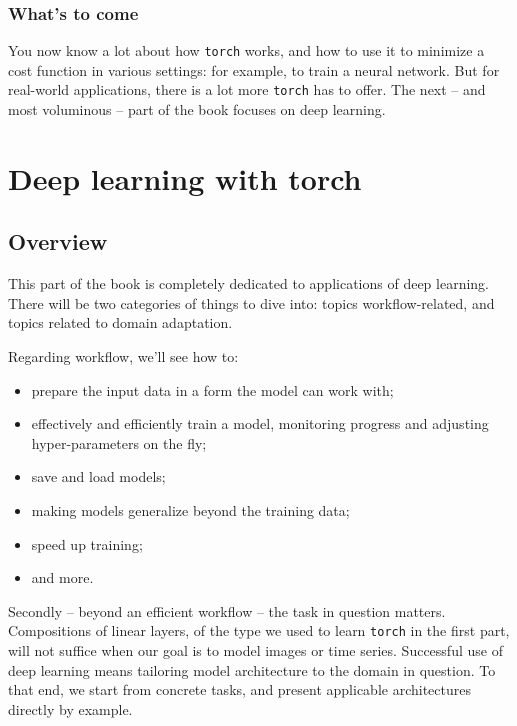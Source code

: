 \documentclass[
  letterpaper,
]{krantz}
\providecommand{\tightlist}{%
  \setlength{\itemsep}{0pt}\setlength{\parskip}{0pt}}\usepackage{longtable,booktabs,array}
\begin{document}
\hypertarget{whats-to-come}{%
\section{What's to come}\label{whats-to-come}}

You now know a lot about how \texttt{torch} works, and how to use it to
minimize a cost function in various settings: for example, to train a
neural network. But for real-world applications, there is a lot more
\texttt{torch} has to offer. The next -- and most voluminous -- part of
the book focuses on deep learning.

\part{Deep learning with torch}

\hypertarget{sec:dl-overview}{%
\chapter{Overview}\label{sec:dl-overview}}

This part of the book is completely dedicated to applications of deep
learning. There will be two categories of things to dive into: topics
workflow-related, and topics related to domain adaptation.

Regarding workflow, we'll see how to:

\begin{itemize}
\tightlist
\item
  prepare the input data in a form the model can work with;
\item
  effectively and efficiently train a model, monitoring progress and
  adjusting hyper-parameters on the fly;
\item
  save and load models;
\item
  making models generalize beyond the training data;
\item
  speed up training;
\item
  and more.
\end{itemize}

Secondly -- beyond an efficient workflow -- the task in question
matters. Compositions of linear layers, of the type we used to learn
\texttt{torch} in the first part, will not suffice when our goal is to
model images or time series. Successful use of deep learning means
tailoring model architecture to the domain in question. To that end, we
start from concrete tasks, and present applicable architectures directly
by example.
\end{document}
